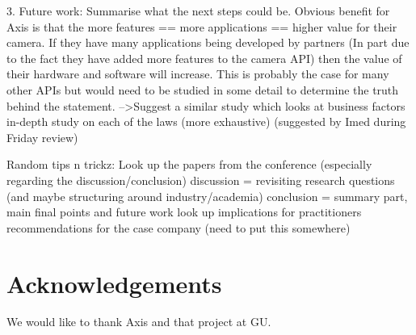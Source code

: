 \documentclass{sig-alternate}
\begin{document}
3. Future work: Summarise what the next steps could be.
Obvious benefit for Axis is that the more features == more applications == higher value for their camera. If they have many applications being developed by partners (In part due to the fact they have added more features to the camera API) then the value of their hardware and software will increase. This is probably the case for many other APIs but would need to be studied in some detail to determine the truth behind the statement.
       -->Suggest a similar study which looks at business factors
 in-depth study on each of the laws (more exhaustive) (suggested by Imed during Friday review)

Random tips n trickz:
       Look up the papers from the conference (especially regarding the discussion/conclusion)
       discussion = revisiting research questions (and maybe structuring around industry/academia)
       conclusion = summary part, main final points and future work 
       look up implications for practitioners 
       recommendations for the case company (need to put this somewhere)





\section{Acknowledgements}
We would like to thank Axis and that project at GU. 


 
\end{document}
